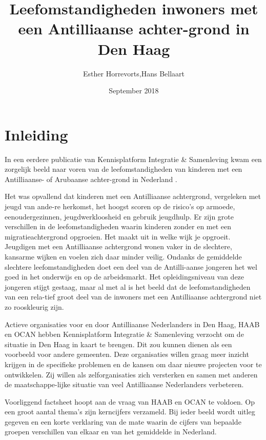 \documentclass[]{book}
\title{Leefomstandigheden inwoners met een Antilliaanse achter-grond in Den
Haag}
\author{Esther Horrevorts,Hans Bellaart}
\date{September 2018}
\begin{document}
\maketitle

{
\setcounter{tocdepth}{1}
\tableofcontents
}
\hypertarget{inleiding}{%
\chapter*{Inleiding}\label{inleiding}}

In een eerdere publicatie van Kennisplatform Integratie \& Samenleving
kwam een zorgelijk beeld naar voren van de leefomstandigheden van
kinderen met een Antilliaanse- of Arubaanse achter-grond in Nederland
\citep{Tierolf2017}.

Het was opvallend dat kinderen met een Antilliaanse achtergrond,
vergeleken met jeugd van ande-re herkomst, het hoogst scoren op de
risico's op armoede, eenoudergezinnen, jeugdwerkloosheid en gebruik
jeugdhulp. Er zijn grote verschillen in de leefomstandigheden waarin
kinderen zonder en met een migratieachtergrond opgroeien. Het maakt uit
in welke wijk je opgroeit. Jeugdigen met een Antilliaanse achtergrond
wonen vaker in de slechtere, kansarme wijken en voelen zich daar minder
veilig. Ondanks de gemiddelde slechtere leefomstandigheden doet een deel
van de Antilli-aanse jongeren het wel goed in het onderwijs en op de
arbeidsmarkt. Het opleidingsniveau van deze jongeren stijgt gestaag,
maar al met al is het beeld dat de leefomstandigheden van een rela-tief
groot deel van de inwoners met een Antilliaanse achtergrond niet zo
rooskleurig zijn.

Actieve organisaties voor en door Antilliaanse Nederlanders in Den Haag,
HAAB en OCAN hebben Kennisplatform Integratie \& Samenleving verzocht om
de situatie in Den Haag in kaart te brengen. Dit zou kunnen dienen als
een voorbeeld voor andere gemeenten. Deze organisaties willen graag meer
inzicht krijgen in de specifieke problemen en de kansen om daar nieuwe
projecten voor te ontwikkelen. Zij willen als zelforganisaties zich
versterken en samen met anderen de maatschappe-lijke situatie van veel
Antilliaanse Nederlanders verbeteren.

Voorliggend factsheet hoopt aan de vraag van HAAB en OCAN te voldoen. Op
een groot aantal thema's zijn kerncijfers verzameld. Bij ieder beeld
wordt uitleg gegeven en een korte verklaring van de mate waarin de
cijfers van bepaalde groepen verschillen van elkaar en van het
gemiddelde in Nederland.
\end{document}
